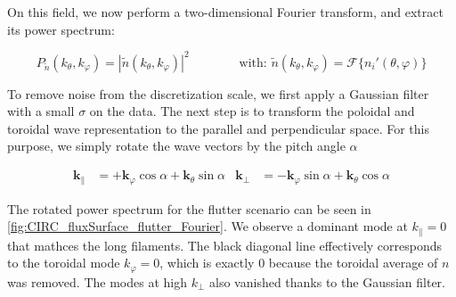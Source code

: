 On this field, we now perform a two-dimensional Fourier transform, and extract its power spectrum:

\begin{equation}
	P_{\tilde{n}}(k_\theta,k_\varphi) = \left|\tilde{n}(k_\theta,k_\varphi)\right|^2\qquad\qquad\text{with: }\tilde{n}(k_\theta,k_\varphi) = \mathcal{F}\{n_i'(\theta,\varphi)\}
\end{equation}

To remove noise from the discretization scale, we first apply a Gaussian filter with a small $\sigma$ on the data. The next step is to transform the poloidal and toroidal wave representation to the parallel and perpendicular space. For this purpose, we simply rotate the wave vectors by the pitch angle $\alpha$
 
\begin{align}
	\textbf{k}_\parallel &= +\textbf{k}_\varphi\cos\alpha + \textbf{k}_\theta\sin\alpha &
	\textbf{k}_\perp     &= -\textbf{k}_\varphi\sin\alpha + \textbf{k}_\theta\cos\alpha
\end{align}

The rotated power spectrum for the flutter scenario can be seen in \ref{fig:CIRC_fluxSurface_flutter_Fourier}. We observe a dominant mode at $k_\parallel=0$ that mathces the long filaments. The black diagonal line effectively corresponds to the toroidal mode $k_\varphi=0$, which is exactly 0 because the toroidal average of $n$ was removed. The modes at high $k_\perp$ also vanished thanks to the Gaussian filter.
 

